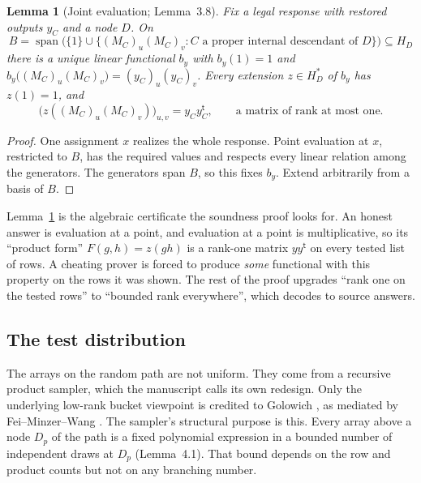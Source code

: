 \documentclass[11pt]{article}
\newtheorem{lemma}[theorem]{Lemma}
\theoremstyle{definition}
\theoremstyle{remark}
\DeclareMathOperator{\Span}{span}
\begin{document}
\begin{lemma}[Joint evaluation; Lemma~3.8]\label{lem:joint-eval}
Fix a legal response with restored outputs $y_C$ and a node $D$. On
\[
 B=\Span\bigl(\{1\}\cup\{(M_C)_u(M_C)_v: C\text{ a proper internal descendant of }D\}\bigr)
   \subseteq H_D
\]
there is a unique linear functional $b_y$ with $b_y(1)=1$ and
$b_y\bigl((M_C)_u(M_C)_v\bigr)=(y_C)_u(y_C)_v$. Every extension
$z\in H_D^*$ of $b_y$ has $z(1)=1$, and
\[
 \bigl(z((M_C)_u(M_C)_v)\bigr)_{u,v}=y_Cy_C^{\mathsf t},
 \qquad\text{a matrix of rank at most one.}
\]
\end{lemma}

\begin{proof}
One assignment $x$ realizes the whole response. Point evaluation at $x$,
restricted to $B$, has the required values and respects every linear relation
among the generators. The generators span $B$, so this fixes $b_y$. Extend
arbitrarily from a basis of $B$.
\end{proof}

\begin{idea}
Lemma~\ref{lem:joint-eval} is the algebraic certificate the soundness proof
looks for. An honest answer is evaluation at a point, and evaluation at a
point is multiplicative, so its ``product form'' $F(g,h)=z(gh)$ is a rank-one
matrix $yy^{\mathsf t}$ on every tested list of rows. A cheating prover is
forced to produce \emph{some} functional with this property on the rows it
was shown. The rest of the proof upgrades ``rank one on the tested rows'' to
``bounded rank everywhere'', which decodes to source answers.
\end{idea}

\subsection{The test distribution}\label{sec:sampler}

The arrays on the random path are not uniform. They come from a recursive
product sampler, which the manuscript calls its own redesign. Only the
underlying low-rank bucket viewpoint is credited to Golowich \cite{Golowich},
as mediated by Fei--Minzer--Wang \cite{FMW}. The sampler's structural purpose
is this. Every array above a node $D_p$ of the path is a
fixed polynomial expression in a bounded number of independent draws at $D_p$
(Lemma~4.1). That bound depends on the row and product counts but not on any
branching number.
\end{document}

